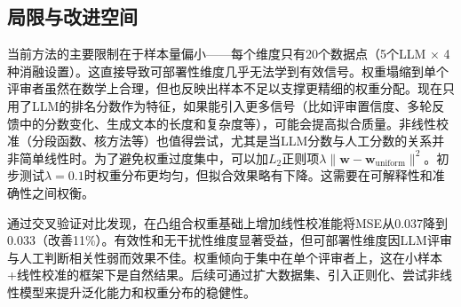 \subsection{局限与改进空间}

当前方法的主要限制在于样本量偏小——每个维度只有20个数据点（5个LLM $\times$ 4种消融设置）。这直接导致可部署性维度几乎无法学到有效信号。权重塌缩到单个评审者虽然在数学上合理，但也反映出样本不足以支撑更精细的权重分配。现在只用了LLM的排名分数作为特征，如果能引入更多信号（比如评审置信度、多轮反馈中的分数变化、生成文本的长度和复杂度等），可能会提高拟合质量。非线性校准（分段函数、核方法等）也值得尝试，尤其是当LLM分数与人工分数的关系并非简单线性时。为了避免权重过度集中，可以加$L_2$正则项$\lambda \|\mathbf{w} - \mathbf{w}_{\text{uniform}}\|^2$。初步测试$\lambda = 0.1$时权重分布更均匀，但拟合效果略有下降。这需要在可解释性和准确性之间权衡。

通过交叉验证对比发现，在凸组合权重基础上增加线性校准能将MSE从0.037降到0.033（改善11\%）。有效性和无干扰性维度显著受益，但可部署性维度因LLM评审与人工判断相关性弱而效果不佳。权重倾向于集中在单个评审者上，这在小样本+线性校准的框架下是自然结果。后续可通过扩大数据集、引入正则化、尝试非线性模型来提升泛化能力和权重分布的稳健性。